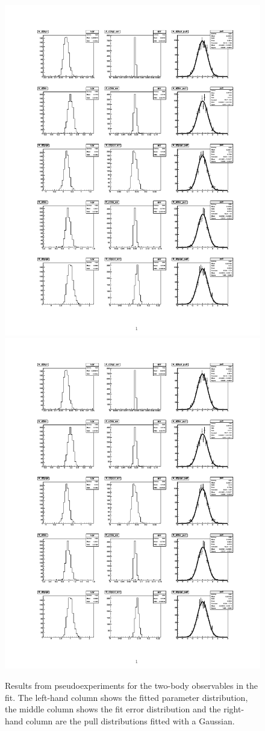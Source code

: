 \begin{figure}[!h]
\centering
\includegraphics[page=1,trim = 0mm 24mm 0mm 15mm,clip,width=0.85\linewidth]{figures/results/toys.pdf}
\includegraphics[page=2,trim = 0mm 165mm 0mm 15mm,clip,width=0.85\linewidth]{figures/results/toys.pdf}
\caption{Results from pseudoexperiments for the two-body \CP observables in the fit. The left-hand column shows the fitted parameter distribution, the middle column shows the fit error distribution and the right-hand column are the pull distributions fitted with a Gaussian.}
\label{pulls1}
\end{figure}

